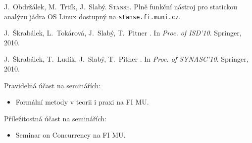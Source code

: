 \documentclass{DG-report}
\newcommand{\note}[1]{[[ \emph{#1} ]]}
\renewcommand{\note}[1]{}
\begin{document}

\renewcommand{\refname}{\vspace*{-12mm}}


\begin{thebibliography}{10}

 J.~Obdržálek, M.~Trtík, J.~Slabý. \textsc{Stanse}. Plně
funkční nástroj pro statickou analýzu jádra OS Linux dostupný na
\texttt{stanse.fi.muni.cz}.

\vspace{1.5mm}\hspace*{-9.3mm} 

J.~Škrabálek, L.~Tokárová, J.~Slabý, T.~Pitner
.
\newblock In {\em Proc. of ISD'10}. Springer, 2010.

J.~Škrabálek, T.~Ludík, J.~Slabý, T.~Pitner
.
\newblock In {\em Proc. of SYNASC'10}. Springer, 2010.

\end{thebibliography}

\ucast

\note{Uveďte semináře, kterých jste se pravidelně nebo alespoň příležitostně
účastnili, resp. na kterých jste vystupovali. Uveďte i případná vystoupení na
navštívených zahraničních pracovištích. Dodržte prosím níže použitý
formát.}\bigskip

\bigskip

\noindent Pravidelná účast na seminářích:\begin{itemize}

  \item Formální metody v teorii i praxi na FI MU.
  
\end{itemize}

\noindent Příležitostná účast na seminářích:\begin{itemize}

  \item Seminar on Concurrency na FI MU.
  
\end{itemize}
\end{document}
